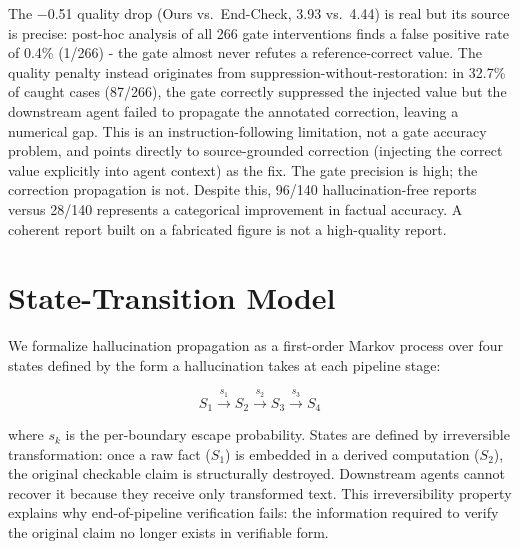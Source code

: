 \documentclass{article}
\theoremstyle{plain}
\theoremstyle{definition}
\theoremstyle{remark}
\begin{document}
The $-$0.51 quality drop (Ours vs.\ End-Check, 3.93 vs.\ 4.44) is real but its source is precise: post-hoc analysis of all 266 gate interventions finds a false positive rate of 0.4\% (1/266) - the gate almost never refutes a reference-correct value. The quality penalty instead originates from suppression-without-restoration: in 32.7\% of caught cases (87/266), the gate correctly suppressed the injected value but the downstream agent failed to propagate the annotated correction, leaving a numerical gap. This is an instruction-following limitation, not a gate accuracy problem, and points directly to source-grounded correction (injecting the correct value explicitly into agent context) as the fix. The gate precision is high; the correction propagation is not. Despite this, 96/140 hallucination-free reports versus 28/140 represents a categorical improvement in factual accuracy. A coherent report built on a fabricated figure is not a high-quality report.

\section{State-Transition Model}
\label{sec:model}

We formalize hallucination propagation as a first-order Markov process over four states defined by the form a hallucination takes at each 
pipeline stage:

$$S_1 \xrightarrow{s_1} S_2 \xrightarrow{s_2} S_3 
\xrightarrow{s_3} S_4$$

where $s_k$ is the per-boundary escape probability. States are defined by irreversible transformation: once a raw fact ($S_1$) is embedded in a derived computation ($S_2$), the original checkable claim is structurally destroyed. Downstream agents cannot recover it because they receive only transformed text. This irreversibility property explains why end-of-pipeline verification fails: the information required to verify the original claim no longer exists in verifiable form.

\begin{table}[h]
\centering
{}
\vspace{5pt}
\caption{Measured per-boundary escape probabilities (derived from Experiment~3 gate detection rates).}
\label{tab:markov}
\end{table}
\end{document}
